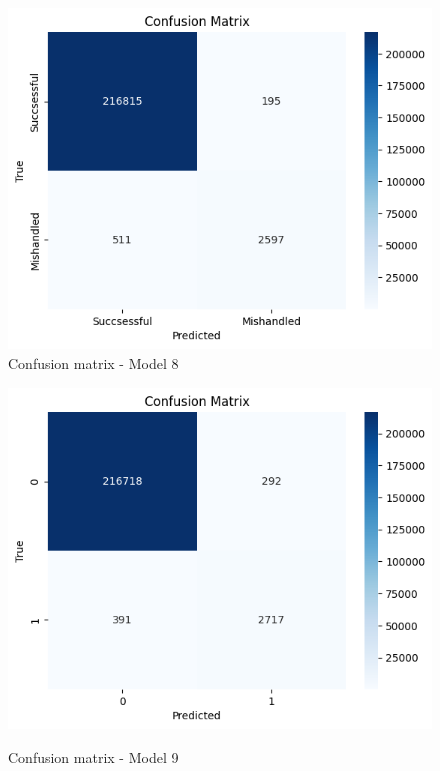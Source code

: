 \documentclass[12pt]{article}
\begin{document}
\begin{figure}
\begin{minipage}[c]{0.45\linewidth}
    \includegraphics[width=1\textwidth]{Confusion_matrix_Model 8.png}\\
    \caption{Confusion matrix - Model 8}
\end{minipage}%
\hfill
\begin{minipage}[c]{0.45\linewidth}
\includegraphics[width=1\textwidth]{Confusion_matrix_Model 9.png}\\
\caption{Confusion matrix - Model 9}
\end{minipage}

\end{figure}
\end{document}
